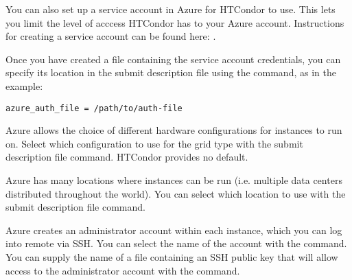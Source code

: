 You can also set up a service account in Azure for HTCondor to use.
This lets you limit the level of acccess HTCondor has to your Azure
account.
Instructions for creating a service account can be found here:
.

Once you have created a file containing the service account credentials,
you can specify its location in
the submit description file using the  command,
as in the example:
\begin{verbatim}
azure_auth_file = /path/to/auth-file
\end{verbatim}

Azure allows the choice of different hardware configurations
for instances to run on.
Select which configuration to use for the  grid type
with the  submit description file command.
HTCondor provides no default.

Azure has many locations where instances can be run (i.e. multiple
data centers distributed throughout the world).
You can select which location to use with the 
submit description file command.

Azure creates an administrator account within each instance, which you
can log into remote via SSH.
You can select the name of the account with the
 command.
You can supply the name of a file containing an SSH public key that
will allow access to the administrator account with the
 command.

